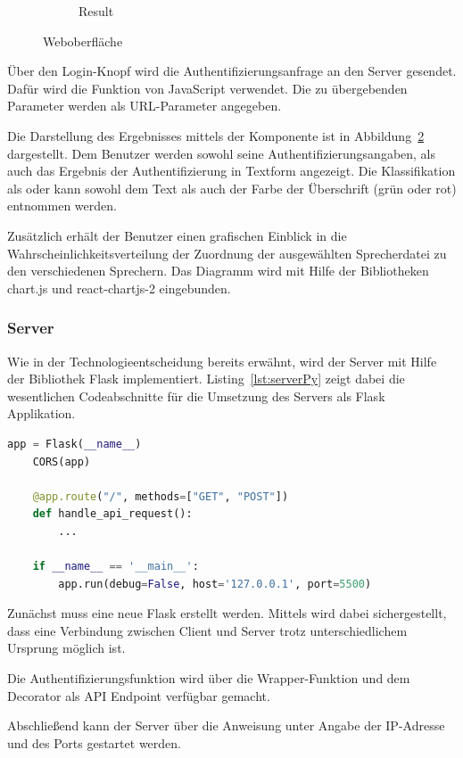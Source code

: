 \begin{figure}[H]
\begin{subfigure}[c]{0.49\textwidth}
        \caption{Result}
        \label{fig:Result}
    \end{subfigure}
    \caption{Weboberfläche}
\end{figure}
Über den Login-Knopf wird die Authentifizierungsanfrage an den Server gesendet.
Dafür wird die  Funktion von JavaScript verwendet.
Die zu übergebenden Parameter werden als URL-Parameter angegeben.

Die Darstellung des Ergebnisses mittels der  Komponente ist in Abbildung~\ref{fig:Result} dargestellt.
Dem Benutzer werden sowohl seine Authentifizierungsangaben, als auch das Ergebnis der Authentifizierung in Textform angezeigt.
Die Klassifikation als  oder  kann sowohl dem Text als auch der Farbe der Überschrift (grün oder rot) entnommen werden.

Zusätzlich erhält der Benutzer einen grafischen Einblick in die Wahrscheinlichkeitsverteilung der Zuordnung der ausgewählten Sprecherdatei zu den verschiedenen Sprechern.
Das Diagramm wird mit Hilfe der Bibliotheken chart.js und react-chartjs-2 eingebunden.

\subsubsection{Server} 
Wie in der Technologieentscheidung bereits erwähnt, wird der Server mit Hilfe der Bibliothek Flask implementiert.
Listing~\ref{lst:serverPy} zeigt dabei die wesentlichen Codeabschnitte für die Umsetzung des Servers als Flask Applikation.
\begin{lstlisting}[language=Python,numbers=none,caption=Ausschnitt server.py,label=lst:serverPy]
    app = Flask(__name__)
    CORS(app)

    @app.route("/", methods=["GET", "POST"])
    def handle_api_request():
        ...

    if __name__ == '__main__':
        app.run(debug=False, host='127.0.0.1', port=5500)
\end{lstlisting}
Zunächst muss eine neue Flask  erstellt werden.
Mittels  wird dabei sichergestellt, dass eine Verbindung zwischen Client und Server trotz unterschiedlichem Ursprung möglich ist.

Die Authentifizierungsfunktion wird über die Wrapper-Funktion  und dem Decorator  als \ac{API} Endpoint verfügbar gemacht.

Abschließend kann der Server über die Anweisung  unter Angabe der IP-Adresse und des Ports gestartet werden.
